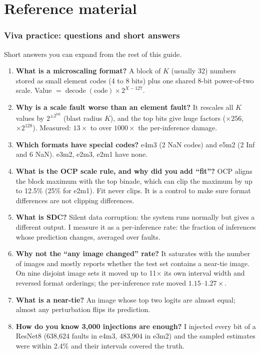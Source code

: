 \part{Reference material}

\section{Viva practice: questions and short answers}
Short answers you can expand from the rest of this guide.

\begin{enumerate}[leftmargin=0.7cm,itemsep=5pt]
\item \textbf{What is a microscaling format?} A block of $K$ (usually 32) numbers stored as small element codes (4 to 8 bits) plus one shared 8-bit power-of-two scale. Value $=\operatorname{decode}(\text{code})\times2^{X-127}$.
\item \textbf{Why is a scale fault worse than an element fault?} It rescales all $K$ values by $2^{\pm2^{\mathrm{bit}}}$ (blast radius $K$), and the top bits give huge factors ($\times256$, $\times2^{128}$). Measured: $13\times$ to over $1000\times$ the per-inference damage.
\item \textbf{Which formats have special codes?} e4m3 (2 NaN codes) and e5m2 (2 Inf and 6 NaN). e3m2, e2m3, e2m1 have none.
\item \textbf{What is the OCP scale rule, and why did you add ``fit''?} OCP aligns the block maximum with the top binade, which can clip the maximum by up to 12.5\% (25\% for e2m1). Fit never clips. It is a control to make sure format differences are not clipping differences.
\item \textbf{What is SDC?} Silent data corruption: the system runs normally but gives a different output. I measure it as a per-inference rate: the fraction of inferences whose prediction changes, averaged over faults.
\item \textbf{Why not the ``any image changed'' rate?} It saturates with the number of images and mostly reports whether the test set contains a near-tie image. On nine disjoint image sets it moved up to 11$\times$ its own interval width and reversed format orderings; the per-inference rate moved $1.15$--$1.27\times$.
\item \textbf{What is a near-tie?} An image whose top two logits are almost equal; almost any perturbation flips its prediction.
\item \textbf{How do you know 3{,}000 injections are enough?} I injected every bit of a ResNet8 (638{,}624 faults in e4m3, 483{,}904 in e3m2) and the sampled estimates were within 2.4\% and their intervals covered the truth.

\end{enumerate}
